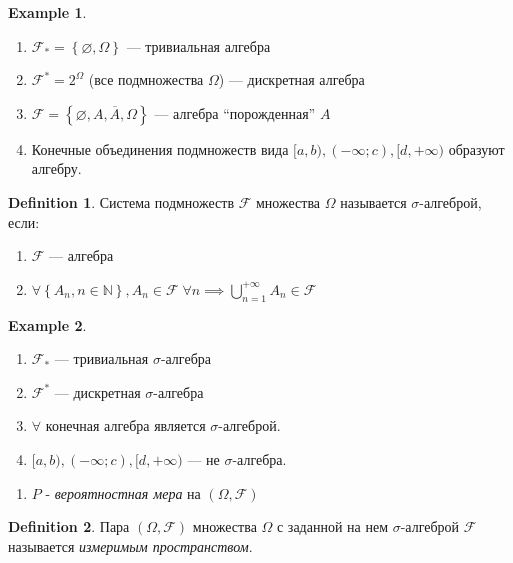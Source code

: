 \documentclass[a4paper]{article}
\theoremstyle{plain}
\theoremstyle{remark}
\theoremstyle{definition}
\newtheorem{definition}{Definition}
\newtheorem{example}{Example}
\newcommand{\setN}{\mathbb{N}}
\newcommand{\setF}{\mathcal{F}}
\newcommand{\braces}[1]{\left\{ #1 \right\}} %
\newcommand{\comp}[1]{\overline{#1}} %
\renewcommand{\emptyset}{\varnothing}
\begin{document}
\begin{example}~
	\begin{enumerate}
		\item $\setF_* = \braces{\emptyset, \Omega}$ --- тривиальная алгебра
		\item $\setF^* = 2^\Omega$ (все подмножества $\Omega$) --- дискретная алгебра
		\item $\setF = \braces{\emptyset, A, \comp{A}, \Omega}$ --- алгебра ``порожденная'' $A$
		\item Конечные объединения подмножеств вида 
					$[a, b), (-\infty; c), [d, +\infty)$ образуют алгебру.\\
	\end{enumerate}
\end{example}

\begin{definition}
	Система подмножеств $\setF$ множества $\Omega$ называется $\sigma$-алгеброй, если:
	\begin{enumerate}
		\item $\setF$ --- алгебра
		\item $\forall \braces{A_n, n \in \setN}, A_n \in \setF \; \forall n 
					\implies \bigcup\limits_{n = 1}^{+\infty} A_n \in \setF$\\
	\end{enumerate}
\end{definition}


\begin{example}~
	\begin{enumerate}
		\item $\setF_* $ --- тривиальная $\sigma$-алгебра
		\item $\setF^* $ --- дискретная $\sigma$-алгебра
		\item $\forall$ конечная алгебра является $\sigma$-алгеброй.
		\item $[a, b), (-\infty; c), [d, +\infty)$ --- не $\sigma$-алгебра.\\
	\end{enumerate}
\end{example}

\begin{enumerate}[resume*=kolm_triple]
	\item
		$P$ - \emph{вероятностная мера} на $(\Omega, \setF)$
\end{enumerate}

\begin{definition}
	Пара $(\Omega, \setF)$ множества $\Omega$ с заданной на нем $\sigma$-алгеброй $\setF$ называется \emph{измеримым пространством}. 
\end{definition}
\end{document}
